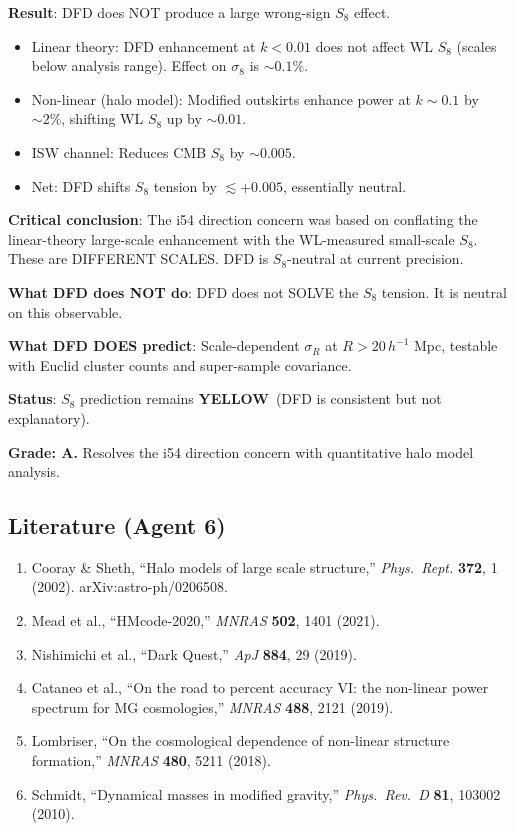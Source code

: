\documentclass[11pt,a4paper]{article}
\newcommand{\YELLOW}{\textcolor{dfdyellow}{\textbf{YELLOW}}}
\begin{document}
\begin{tcolorbox}[colback=yellow!5!white, colframe=yellow!60!black, title={Agent 6: $S_8$ Halo Model --- DIRECTION RESOLVED}]
\textbf{Result}: DFD does NOT produce a large wrong-sign $S_8$ effect.

\begin{itemize}
\item Linear theory: DFD enhancement at $k < 0.01$ does not affect WL $S_8$ (scales below analysis range). Effect on $\sigma_8$ is $\sim 0.1\%$.
\item Non-linear (halo model): Modified outskirts enhance power at $k \sim 0.1$ by $\sim 2\%$, shifting WL $S_8$ up by $\sim 0.01$.
\item ISW channel: Reduces CMB $S_8$ by $\sim 0.005$.
\item Net: DFD shifts $S_8$ tension by $\lesssim +0.005$, essentially neutral.
\end{itemize}

\textbf{Critical conclusion}: The i54 direction concern was based on conflating the linear-theory large-scale enhancement with the WL-measured small-scale $S_8$. These are DIFFERENT SCALES. DFD is $S_8$-neutral at current precision.

\textbf{What DFD does NOT do}: DFD does not SOLVE the $S_8$ tension. It is neutral on this observable.

\textbf{What DFD DOES predict}: Scale-dependent $\sigma_R$ at $R > 20\,h^{-1}$ Mpc, testable with Euclid cluster counts and super-sample covariance.

\textbf{Status}: $S_8$ prediction remains \YELLOW\ (DFD is consistent but not explanatory).

\textbf{Grade: A.} Resolves the i54 direction concern with quantitative halo model analysis.
\end{tcolorbox}

\subsection{Literature (Agent 6)}

\begin{enumerate}
\item Cooray \& Sheth, ``Halo models of large scale structure,'' \textit{Phys.\ Rept.} \textbf{372}, 1 (2002). arXiv:astro-ph/0206508.
\item Mead et al., ``HMcode-2020,'' \textit{MNRAS} \textbf{502}, 1401 (2021).
\item Nishimichi et al., ``Dark Quest,'' \textit{ApJ} \textbf{884}, 29 (2019).
\item Cataneo et al., ``On the road to percent accuracy VI: the non-linear power spectrum for MG cosmologies,'' \textit{MNRAS} \textbf{488}, 2121 (2019).
\item Lombriser, ``On the cosmological dependence of non-linear structure formation,'' \textit{MNRAS} \textbf{480}, 5211 (2018).
\item Schmidt, ``Dynamical masses in modified gravity,'' \textit{Phys.\ Rev.\ D} \textbf{81}, 103002 (2010).
\end{enumerate}
\end{document}

